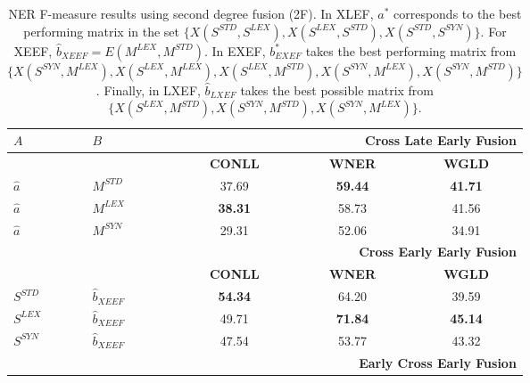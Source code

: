 \documentclass{llncs}
\newcommand\mlex{M^{\scriptscriptstyle LEX}}
\newcommand\mstd{M^{\scriptscriptstyle STD}}
\newcommand\slex{S^{\scriptscriptstyle LEX}}
\newcommand\ssyn{S^{\scriptscriptstyle SYN}}
\begin{document}
\begin{table}[!tb]
\begin{minipage}[t]{0.48\textwidth}
\caption{NER F-measure results using second degree fusion (2F). In XLEF, ${a^*}$ corresponds to the best performing matrix in the set $\{ X(S^{\scriptscriptstyle STD}, S^{\scriptscriptstyle LEX}),X(S^{\scriptscriptstyle LEX}, S^{\scriptscriptstyle STD}), \allowbreak X(S^{\scriptscriptstyle STD}, S^{\scriptscriptstyle SYN})\}$. For XEEF,  $\hat{b}_{\scriptscriptstyle XEEF}=E(\mlex, \mstd)$. In EXEF, $b^*_{\scriptscriptstyle EXEF}$  takes the best performing matrix from $\{X(\ssyn, \mlex), \allowbreak X(\slex, \mlex), X(\slex, \mstd), \allowbreak X(\ssyn, \mlex), X(\ssyn, \mstd) \}$. Finally, in LXEF, $\hat{b}_{\scriptscriptstyle LXEF}$ takes the best possible matrix from $\{X(\slex, \mstd), X(\ssyn, \mstd), \allowbreak X(\ssyn, \mlex) \}$.}
\label{tab:ner_2d}
\begin{tabular}{@{}llccc@{}}
	\toprule
	$A$                      & $B$            & \multicolumn{3}{r}{\textbf{Cross Late Early Fusion}}  \\ \midrule
	                         &                & \textbf{CONLL} & \textbf{WNER}  &             \textbf{WGLD}             \\
	\cmidrule{3-5}
$\hat{a}$ & $M^{\scriptscriptstyle STD}$      & 37.69 & \textbf{59.44} &            \textbf{41.71}             \\
	$\hat{a}$                & $M^{\scriptscriptstyle LEX}$      & \textbf{38.31} & 58.73 &            41.56             \\
	$\hat{a}$                & $M^{\scriptscriptstyle SYN}$      & 29.31 & 52.06 &            34.91             \\ \midrule
	                         &                & \multicolumn{3}{r}{\textbf{Cross Early Early Fusion}} \\ \midrule
	                         &                & \textbf{CONLL} & \textbf{WNER}  &             \textbf{WGLD}             \\
	\cmidrule{3-5}
$S^{\scriptscriptstyle STD}$ & $\hat{b}_{\scriptscriptstyle XEEF}$          &   \textbf{54.34}    &    64.20   & 39.59 \\
	$S^{\scriptscriptstyle LEX}$                &$\hat{b}_{\scriptscriptstyle XEEF}$         &  49.71     &   \textbf{71.84}    &  \textbf{45.14}\\
	$S^{\scriptscriptstyle SYN}$                & $\hat{b}_{\scriptscriptstyle XEEF}$         &  47.54     &   53.77    & 43.32 \\ \midrule
	                         &                & \multicolumn{3}{r}{\textbf{Early Cross Early Fusion}} \\ \midrule

\end{tabular}
\end{minipage}
\end{table}
\end{document}
